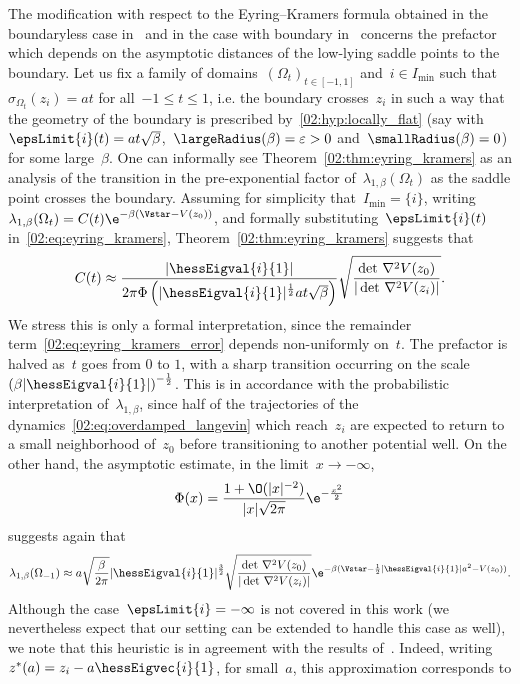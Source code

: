     \begin{remark}
    The modification with respect to the Eyring--Kramers formula obtained in the boundaryless case in~\cite{HS85,BGK05,HKN04} and in the case with boundary in~\cite{HN06,LPN21} concerns the prefactor which depends on the asymptotic distances of the low-lying saddle points to the boundary.
    Let us fix a family of domains~$(\Omega_t)_{t\in[-1,1]}$ and~$i\in I_{\min}$ such that~$\sigma_{\Omega_t}(z_i)=at$ for all~$-1\leq t \leq 1$, i.e. the boundary crosses~$z_i$ in such a way that the geometry of the boundary is prescribed by~\eqref{02:hyp:locally_flat} (say with~$\epsLimit{i}(t)=a t\sqrt\beta$,~$\largeRadius(\beta)=\varepsilon>0$ and~$\smallRadius(\beta)=0$) for some large~$\beta$. One can informally see Theorem~\ref{02:thm:eyring_kramers} as an analysis of the transition in the pre-exponential factor of~$\lambda_{1,\beta}(\Omega_t)$ as the saddle point crosses the boundary.
    Assuming for simplicity that~$I_{\min}=\{i\}$, writing~$\lambda_{1,\beta}(\Omega_t)=C(t)\e^{-\beta(\Vstar-V(z_0))}$, and formally substituting~$\epsLimit{i}(t)$ in~\eqref{02:eq:eyring_kramers}, Theorem~\ref{02:thm:eyring_kramers} suggests that
    \[C(t)\approx \frac{|\hessEigval{i}{1}|}{2\pi\Phi\left(|\hessEigval{i}{1}|^{\frac12}at\sqrt\beta\right)}\sqrt{\frac{\det\,\nabla^2 V(z_0)}{|\det\,\nabla^2 V(z_i)|}}.\]
    We stress this is only a formal interpretation, since the remainder term~\eqref{02:eq:eyring_kramers_error} depends non-uniformly on~$t$.
    The prefactor is halved as~$t$ goes from $0$ to $1$, with a sharp transition occurring on the scale~$\left(\beta|\hessEigval{i}{1}|\right)^{-\frac12}$. This is in accordance with the probabilistic interpretation of~$\lambda_{1,\beta}$, since half of the trajectories of the dynamics~\eqref{02:eq:overdamped_langevin} which reach~$z_i$ are expected to return to a small neighborhood of~$z_0$ before transitioning to another potential well.
    On the other hand, the asymptotic estimate, in the limit~$x\to-\infty$,
    \begin{equation}
        \label{02:eq:phi_tail_asymptotic}
        \Phi(x) = \frac{1+\O(|x|^{-2})}{|x|\sqrt{2\pi}}\e^{-\frac{x^2}2}
    \end{equation}
    suggests again that
    \[\lambda_{1,\beta}(\Omega_{-1})\approx a\sqrt{\frac{\beta}{2\pi}}|\hessEigval{i}{1}|^{\frac32}\sqrt{\frac{\det\,\nabla^2 V(z_0)}{|\det\,\nabla^2 V(z_i)|}}\e^{-\beta(\Vstar-\frac12|\hessEigval{i}{1}|a^2-V(z_0))}.\]
    Although the case~$\epsLimit{i}=-\infty$ is not covered in this work (we nevertheless expect that our setting can be extended to handle this case as well), we note that this heuristic is in agreement with the results of~\cite{HN06}. Indeed, writing~$z^*(a)=z_i-a\hessEigvec{i}{1}$, for small~$a$, this approximation corresponds to

\end{remark}
